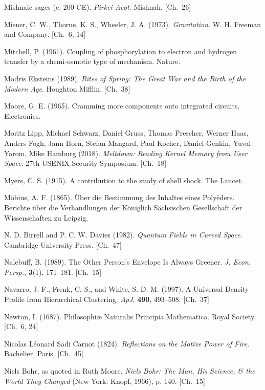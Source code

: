 \begin{list}{}{%
  \setlength{\leftmargin}{2em}%
  \setlength{\itemindent}{-2em}%
  \setlength{\itemsep}{0.35\baselineskip}%
  \setlength{\parsep}{0pt}%
  \setlength{\topsep}{0.5em}}
\item Mishnaic sages (c. 200 CE). \textit{Pirkei Avot}. Mishnah. \hfill {\scriptsize [Ch.~26]}
\item Misner, C. W., Thorne, K. S., Wheeler, J. A. (1973). \textit{Gravitation}. W. H. Freeman and Company. \hfill {\scriptsize [Ch.~6, 14]}
\item Mitchell, P. (1961). Coupling of phosphorylation to electron and hydrogen transfer by a chemi-osmotic type of mechanism. Nature.
\item Modris Eksteins (1989). \textit{Rites of Spring: The Great War and the Birth of the Modern Age}. Houghton Mifflin. \hfill {\scriptsize [Ch.~38]}
\item Moore, G. E. (1965). Cramming more components onto integrated circuits. Electronics.
\item Moritz Lipp, Michael Schwarz, Daniel Gruss, Thomas Prescher, Werner Haas, Anders Fogh, Jann Horn, Stefan Mangard, Paul Kocher, Daniel Genkin, Yuval Yarom, Mike Hamburg (2018). \textit{Meltdown: Reading Kernel Memory from User Space}. 27th USENIX Security Symposium. \hfill {\scriptsize [Ch.~18]}
\item Myers, C. S. (1915). A contribution to the study of shell shock. The Lancet.
\item Möbius, A. F. (1865). Über die Bestimmung des Inhaltes eines Polyëders. Berichte über die Verhandlungen der Königlich Sächsischen Gesellschaft der Wissenschaften zu Leipzig.
\item N. D. Birrell and P. C. W. Davies (1982). \textit{Quantum Fields in Curved Space}. Cambridge University Press. \hfill {\scriptsize [Ch.~47]}
\item Nalebuff, B. (1989). The Other Person's Envelope Is Always Greener. \textit{J. Econ. Persp.}, \textbf{3}(1), 171–181. \hfill {\scriptsize [Ch.~15]}
\item Navarro, J. F., Frenk, C. S., and White, S. D. M. (1997). A Universal Density Profile from Hierarchical Clustering. \textit{ApJ}, \textbf{490}, 493–508. \hfill {\scriptsize [Ch.~37]}
\item Newton, I. (1687). Philosophiæ Naturalis Principia Mathematica. Royal Society. \hfill {\scriptsize [Ch.~6, 24]}
\item Nicolas Léonard Sadi Carnot (1824). \textit{Reflections on the Motive Power of Fire}. Bachelier, Paris. \hfill {\scriptsize [Ch.~45]}
\item Niels Bohr, as quoted in Ruth Moore, \textit{Niels Bohr: The Man, His Science, \& the World They Changed} (New York: Knopf, 1966), p. 140. \hfill {\scriptsize [Ch.~15]}

\end{list}
